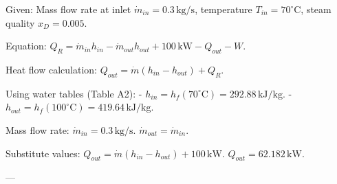Given:  
Mass flow rate at inlet \( \dot{m}_{in} = 0.3 \, \text{kg/s} \), temperature \( T_{in} = 70^\circ \text{C} \), steam quality \( x_D = 0.005 \).  

Equation:  
\( Q_R = \dot{m}_{in} h_{in} - \dot{m}_{out} h_{out} + 100 \, \text{kW} - Q_{out} - W \).  

Heat flow calculation:  
\( Q_{out} = \dot{m} (h_{in} - h_{out}) + Q_R \).  

Using water tables (Table A2):  
- \( h_{in} = h_f(70^\circ \text{C}) = 292.88 \, \text{kJ/kg} \).  
- \( h_{out} = h_f(100^\circ \text{C}) = 419.64 \, \text{kJ/kg} \).  

Mass flow rate:  
\( \dot{m}_{in} = 0.3 \, \text{kg/s} \).  
\( \dot{m}_{out} = \dot{m}_{in} \).  

Substitute values:  
\( Q_{out} = \dot{m} (h_{in} - h_{out}) + 100 \, \text{kW} \).  
\( Q_{out} = 62.182 \, \text{kW} \).  

---